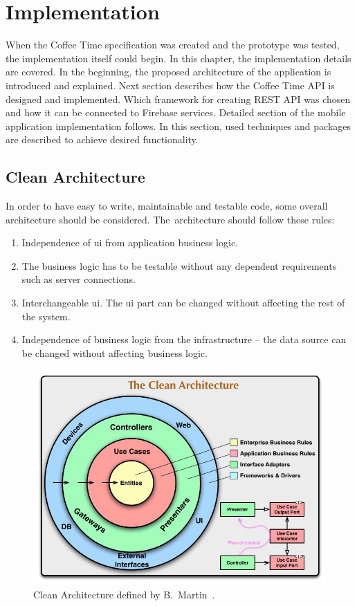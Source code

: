 \chapter{Implementation}
\label{ch:implementation}
When the Coffee Time specification was created and the prototype was tested, the implementation itself could begin. In this chapter, the implementation details are covered. In the beginning, the proposed architecture of the application is introduced and explained. Next section describes how the Coffee Time API is designed and implemented. Which framework for creating REST API was chosen and how it can be connected to Firebase services. Detailed section of the mobile application implementation follows. In this section, used techniques and packages are described to achieve desired functionality. 
\section{Clean Architecture}
In order to have easy to write, maintainable and testable code, some overall architecture should be considered. The~architecture should follow these rules: 
\begin{enumerate}
\item Independence of \gls{ui} from application business logic. 
\item The business logic has to be testable without any dependent requirements such as server connections.
\item Interchangeable \gls{ui}. The \gls{ui} part can be changed without affecting the rest of the system.
\item Independence of business logic from the infrastructure -- the data source can be changed without affecting business logic.
\end{enumerate}

\begin{figure}[ht]
    \centering
    \includegraphics[width=0.75\linewidth]{img/implementation/CleanArchitecture.jpg}
    \caption{Clean Architecture defined by B.~Martin~\cite{clean-architecture-article}.}
    \label{fig:clean-arch-bmartin}
\end{figure}

